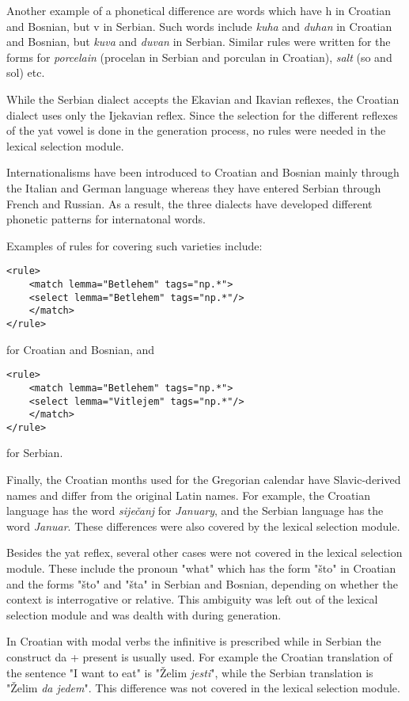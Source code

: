 Another example of a phonetical difference are words which have h in Croatian and Bosnian, but v in Serbian.
Such words include \emph{kuha} and \emph{duhan} in Croatian and Bosnian, but \emph{kuva} and \emph{duvan} in Serbian.
Similar rules were written for the forms for \emph{porcelain} (procelan in Serbian and porculan in Croatian), 
\emph{salt} (so and sol) etc.

While the Serbian dialect accepts the Ekavian and Ikavian reflexes, 
the Croatian dialect uses only the Ijekavian reflex.
Since the selection for the different reflexes of the yat vowel is done in the generation process,
no rules were needed in the lexical selection module.

Internationalisms have been introduced to Croatian and Bosnian mainly through the Italian and German language
whereas they have entered Serbian through French and Russian. 
As a result, the three dialects have developed different phonetic patterns for internatonal words.

Examples of rules for covering such varieties include:
{\small
\begin{Verbatim}
<rule>
    <match lemma="Betlehem" tags="np.*">
	<select lemma="Betlehem" tags="np.*"/>
    </match>
</rule>
\end{Verbatim}
}
for Croatian and Bosnian, and
{\small
\begin{Verbatim}
<rule>
    <match lemma="Betlehem" tags="np.*">
	<select lemma="Vitlejem" tags="np.*"/>
    </match>
</rule>
\end{Verbatim}
}
for Serbian.

Finally, the Croatian months used for the Gregorian calendar have Slavic-derived names and differ from the original Latin names.
For example, the Croatian language has the word \emph{siječanj} for \emph{January}, and 
the Serbian language has the word \emph{Januar}.
These differences were also covered by the lexical selection module.

Besides the yat reflex, several other cases were not covered in the lexical selection module. These include the pronoun "what" which has the form "što" in Croatian and the forms "što" and "šta" in Serbian and Bosnian, depending on whether the context is interrogative or relative. This ambiguity was left out of the lexical selection module and was dealth with during generation.

In Croatian with modal verbs the infinitive is prescribed while in Serbian the construct da + present is usually used.
For example the Croatian translation of the sentence "I want to eat" is "Želim \emph{jesti}", while the Serbian translation is "Želim \emph{da jedem}". This difference was not covered in the lexical selection module.




